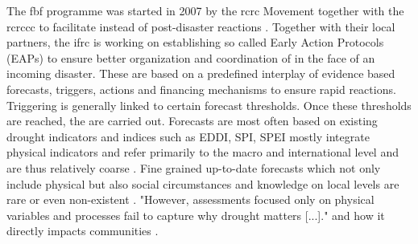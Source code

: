 The \acrfull{fbf} programme was started in 2007 by the \acrlong{rcrc} Movement together with the \acrlong*{rcrccc} to facilitate  instead of post-disaster reactions \autocite{ifrcForecastbasedFinancingNew2019}. Together with their local partners, the \acrfull*{ifrc} is working on establishing so called Early Action Protocols (EAPs) to ensure better organization and coordination of  in the face of an incoming disaster. These  are based on a predefined interplay of evidence based forecasts, triggers, actions and financing mechanisms to ensure rapid reactions.\newline
Triggering  is generally linked to certain forecast thresholds. Once these thresholds are reached, the  are carried out. Forecasts are  most often based on existing drought indicators and indices such as EDDI, SPI, SPEI mostly integrate physical indicators and refer primarily to the macro and international level and are thus relatively coarse \autocite{svobodaHandbookDroughtIndicators2016}. Fine grained up-to-date forecasts which not only include physical but also social circumstances and knowledge on local levels are rare or even non-existent \autocite{enenkelWhyPredictClimate2020,masindeFrameworkPredictingDroughts2010a}. "However, assessments focused only on physical variables and processes fail to capture why drought matters [...]."\autocite[3]{lackstromBackyardHydroclimatologyCitizen2022} and how it directly impacts communities \autocite{boultDroughtImpactbasedForecasting2022,enenkelWhyPredictClimate2020}.\newline
